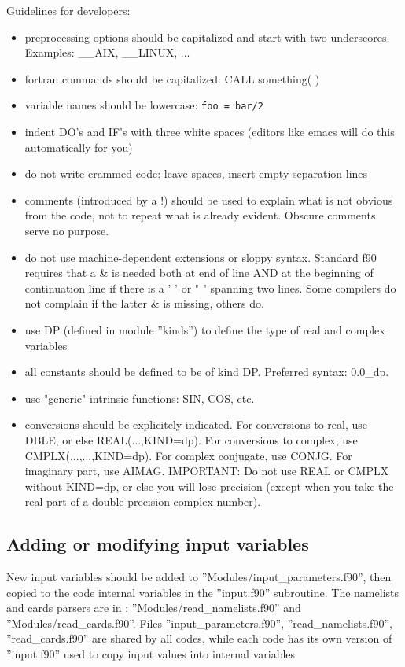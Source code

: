 \documentclass[12pt,a4paper]{article}
\begin{document}
Guidelines for developers:
\begin{itemize}
\item preprocessing options should be capitalized and start with two underscores. Examples: \_\_AIX, \_\_LINUX, ...
\item fortran commands should be capitalized: 
CALL something( )
\item variable names should be lowercase: \texttt{foo = bar/2}
\item indent DO's and IF's with three white spaces (editors like emacs will do this automatically for you)
\item do not write crammed code: leave spaces, insert empty separation lines
\item comments (introduced by a !) should be used to explain what is not obvious from the code, not to repeat what is already evident. Obscure comments serve no purpose.
\item do not use machine-dependent extensions or sloppy syntax. Standard f90 requires that a \& is needed both at end of line AND at the beginning of continuation line if there is a ' ' or " " spanning two lines. Some compilers do not complain if the latter \& is missing, others do.
\item use DP (defined in module ''kinds'') to define the type of real and complex variables
\item all constants should be defined to be of kind DP.  Preferred syntax: 0.0\_dp.
\item use "generic" intrinsic functions: SIN, COS, etc.
\item conversions should be explicitely indicated. For conversions to real, 
use DBLE, or else REAL(...,KIND=dp). For conversions to complex, use 
CMPLX(...,...,KIND=dp). For complex conjugate, use CONJG.  For imaginary part, 
use AIMAG.  IMPORTANT: Do not use REAL or CMPLX without KIND=dp, or else you 
will lose precision (except when you take the real part of a 
double precision complex number).
\end{itemize}

\subsection{Adding or modifying input variables}

New input variables should be added to 
''Modules/input\_parameters.f90'',
then copied to the code internal variables in the ''input.f90''
subroutine. The namelists and cards parsers are in :
''Modules/read\_namelists.f90'' and ''Modules/read\_cards.f90''.
Files ''input\_parameters.f90'', ''read\_namelists.f90'',
''read\_cards.f90'' are shared by all codes, while each code
has its own version of ''input.f90''  used to copy input values
into internal variables
\end{document}
